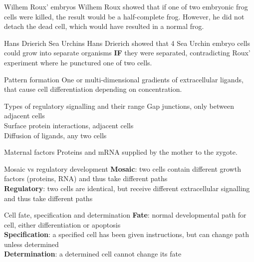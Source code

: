 
\begin{flashcard}[Experiment]{Wilhem Roux' embryos}
	Wilhem Roux showed that if one of two embryonic frog cells were killed, the result would be a half-complete frog. However, he did not detach the dead cell, which would have resulted in a normal frog. 
\end{flashcard}

\begin{flashcard}[Experiment]{Hans Drierich Sea Urchins}
	Hans Drierich showed that 4 Sea Urchin embryo cells could grow into separate organisms \textbf{IF} they were separated, contradicting Roux' experiment where he punctured one of two cells.
\end{flashcard}

\begin{flashcard}[Definition]{Pattern formation}
	One or multi-dimensional gradients of extracellular ligands, that cause cell differentiation depending on concentration. 
\end{flashcard}

\begin{flashcard}[Definition]{Types of regulatory signalling and their range}
    Gap junctions, only between adjacent cells \\
    Surface protein interactions, adjacent cells \\
    Diffusion of ligands, any two cells \\
\end{flashcard}

\begin{flashcard}[Definition]{Maternal factors}
	Proteins and mRNA supplied by the mother to the zygote. 
\end{flashcard}

\begin{flashcard}[Definition]{Mosaic vs regulatory development}
	\textbf{Mosaic}: two cells contain different growth factors (proteins, RNA) and thus take different paths \\
	\textbf{Regulatory}: two cells are identical, but receive different extracellular signalling and thus take different paths
\end{flashcard}

\begin{flashcard}[Definition]{Cell fate, specification and determination}
	\textbf{Fate}: normal developmental path for cell, either differentiation or apoptosis \\
	\textbf{Specification}: a specified cell has been given instructions, but can change path unless determined \\
	\textbf{Determination}: a determined cell cannot change its fate
\end{flashcard}

